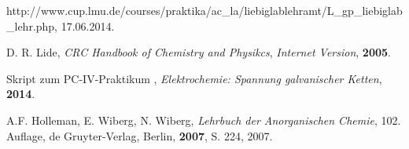 \begin{thebibliography}{999}

 http://www.cup.lmu.de/courses/praktika/ac\_la/liebiglablehramt/L\_gp\_liebiglab\_lehr.php, 17.06.2014.

 D. R. Lide, \textit{CRC Handbook of Chemistry and Physikcs}, \textit{Internet Version}, \textbf{2005}.

 Skript zum PC-IV-Praktikum , \textit{Elektrochemie: Spannung galvanischer Ketten}, \textbf{2014}.

 A.F. Holleman, E. Wiberg, N. Wiberg, \textit{Lehrbuch der Anorganischen Chemie}, 102. Auflage, de Gruyter-Verlag, Berlin, \textbf{2007}, S. 224, 2007.

\end{thebibliography}